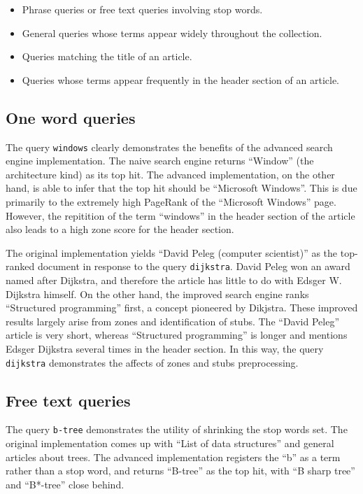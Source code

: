 \documentclass[11pt]{article}
\begin{document}
\begin{itemize}
\item Phrase queries or free text queries involving stop words.
\item General queries whose terms appear widely throughout the collection.
\item Queries matching the title of an article.
\item Queries whose terms appear frequently in the header section of an article.
\end{itemize}


\subsection*{One word queries}

The query \texttt{windows} clearly demonstrates the benefits of the advanced search engine implementation.
The naive search engine returns ``Window'' (the architecture kind) as its top hit. The advanced implementation, on
the other hand, is able to infer that the top hit should be ``Microsoft Windows''. This is due primarily to
the extremely high PageRank of the ``Microsoft Windows'' page. However, the repitition of the term ``windows''
in the header section of the article also leads to a high zone score for the header section.

The original implementation yields ``David Peleg (computer scientist)'' as the top-ranked document in response to the query
\texttt{dijkstra}. David Peleg won an award named after Dijkstra, and therefore the article has little to do with
Edsger W. Dijkstra himself. On the other hand, the improved search
engine ranks ``Structured programming'' first, a concept pioneered by Dikjstra. These improved results
largely arise from zones and identification of stubs. The ``David Peleg'' article is very short,
whereas ``Structured programming'' is longer and mentions Edsger Dijkstra several times in the header
section. In this way, the query \texttt{dijkstra} demonstrates the affects of zones and stubs preprocessing.

\subsection*{Free text queries}

The query \texttt{b-tree} demonstrates the utility of shrinking the stop words set. The original implementation
comes up with ``List of data structures'' and general articles about trees. The advanced implementation registers
the ``b'' as a term rather than a stop word, and returns ``B-tree'' as the top hit, with ``B sharp tree'' and ``B*-tree'' close behind.
\end{document}
